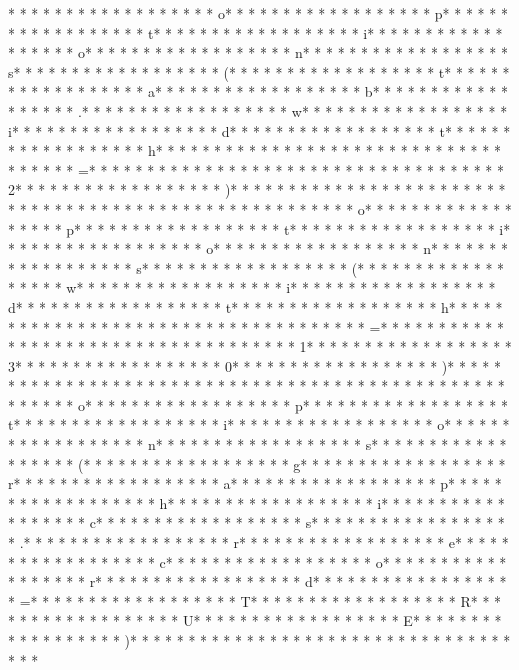 * * *  * * *  * * *  *  * * *  *  * * *  * o* * *  * * *  * * *  *  * * *  *  * * *  * p* * *  * * *  * * *  *  * * *  *  * * *  * t* * *  * * *  * * *  *  * * *  *  * * *  * i* * *  * * *  * * *  *  * * *  *  * * *  * o* * *  * * *  * * *  *  * * *  *  * * *  * n* * *  * * *  * * *  *  * * *  *  * * *  * s* * *  * * *  * * *  *  * * *  *  * * *  * (* * *  * * *  * * *  *  * * *  *  * * *  * t* * *  * * *  * * *  *  * * *  *  * * *  * a* * *  * * *  * * *  *  * * *  *  * * *  * b* * *  * * *  * * *  *  * * *  *  * * *  * .* * *  * * *  * * *  *  * * *  *  * * *  * w* * *  * * *  * * *  *  * * *  *  * * *  * i* * *  * * *  * * *  *  * * *  *  * * *  * d* * *  * * *  * * *  *  * * *  *  * * *  * t* * *  * * *  * * *  *  * * *  *  * * *  * h* * *  * * *  * * *  *  * * *  *  * * *  *  * * *  * * *  * * *  *  * * *  *  * * *  * =* * *  * * *  * * *  *  * * *  *  * * *  *  * * *  * * *  * * *  *  * * *  *  * * *  * 2* * *  * * *  * * *  *  * * *  *  * * *  * )* * *  * * *  * * *  *  * * *  *  * * *  *  * * *  * * *  * * *  *  * * *  *  * * *  * 
* * *  * * *  * * *  *  * * *  *  * * *  * o* * *  * * *  * * *  *  * * *  *  * * *  * p* * *  * * *  * * *  *  * * *  *  * * *  * t* * *  * * *  * * *  *  * * *  *  * * *  * i* * *  * * *  * * *  *  * * *  *  * * *  * o* * *  * * *  * * *  *  * * *  *  * * *  * n* * *  * * *  * * *  *  * * *  *  * * *  * s* * *  * * *  * * *  *  * * *  *  * * *  * (* * *  * * *  * * *  *  * * *  *  * * *  * w* * *  * * *  * * *  *  * * *  *  * * *  * i* * *  * * *  * * *  *  * * *  *  * * *  * d* * *  * * *  * * *  *  * * *  *  * * *  * t* * *  * * *  * * *  *  * * *  *  * * *  * h* * *  * * *  * * *  *  * * *  *  * * *  *  * * *  * * *  * * *  *  * * *  *  * * *  * =* * *  * * *  * * *  *  * * *  *  * * *  *  * * *  * * *  * * *  *  * * *  *  * * *  * 1* * *  * * *  * * *  *  * * *  *  * * *  * 3* * *  * * *  * * *  *  * * *  *  * * *  * 0* * *  * * *  * * *  *  * * *  *  * * *  * )* * *  * * *  * * *  *  * * *  *  * * *  * 
* * *  * * *  * * *  *  * * *  *  * * *  *  * * *  * * *  * * *  *  * * *  *  * * *  * o* * *  * * *  * * *  *  * * *  *  * * *  * p* * *  * * *  * * *  *  * * *  *  * * *  * t* * *  * * *  * * *  *  * * *  *  * * *  * i* * *  * * *  * * *  *  * * *  *  * * *  * o* * *  * * *  * * *  *  * * *  *  * * *  * n* * *  * * *  * * *  *  * * *  *  * * *  * s* * *  * * *  * * *  *  * * *  *  * * *  * (* * *  * * *  * * *  *  * * *  *  * * *  * g* * *  * * *  * * *  *  * * *  *  * * *  * r* * *  * * *  * * *  *  * * *  *  * * *  * a* * *  * * *  * * *  *  * * *  *  * * *  * p* * *  * * *  * * *  *  * * *  *  * * *  * h* * *  * * *  * * *  *  * * *  *  * * *  * i* * *  * * *  * * *  *  * * *  *  * * *  * c* * *  * * *  * * *  *  * * *  *  * * *  * s* * *  * * *  * * *  *  * * *  *  * * *  * .* * *  * * *  * * *  *  * * *  *  * * *  * r* * *  * * *  * * *  *  * * *  *  * * *  * e* * *  * * *  * * *  *  * * *  *  * * *  * c* * *  * * *  * * *  *  * * *  *  * * *  * o* * *  * * *  * * *  *  * * *  *  * * *  * r* * *  * * *  * * *  *  * * *  *  * * *  * d* * *  * * *  * * *  *  * * *  *  * * *  * =* * *  * * *  * * *  *  * * *  *  * * *  * T* * *  * * *  * * *  *  * * *  *  * * *  * R* * *  * * *  * * *  *  * * *  *  * * *  * U* * *  * * *  * * *  *  * * *  *  * * *  * E* * *  * * *  * * *  *  * * *  *  * * *  * )* * *  * * *  * * *  *  * * *  *  * * *  *  * * *  * * *  * * *  *  * * *  *  * * *  * 
